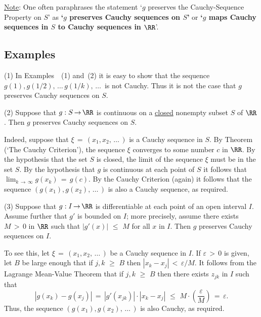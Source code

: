         \underline{Note}: One often paraphrases the statement `$g$ preserves the Cauchy-Sequence Property on $S$' as {\bf `$g$ preserves Cauchy sequences on $S$'}  or {\bf `$g$ maps Cauchy sequences in $S$ to Cauchy sequences in ${\RR}$}'.

\V

            \subsection{\small{\bf Examples}}
            \label{ExampF20.70}

\V

\hspace*{\parindent}(1) In Examples~~(1) and~(2) it is easy to show that the sequence $g(1), g(1/2), \,{\ldots}\,g(1/k),\,{\ldots}\,$ is not Cauchy.
    Thus it is not the case that $g$ preserves Cauchy sequences on $S$.

\V

        (2) Suppose that $g:S \,{\rightarrow}\, {\RR}$ is continuous on a \underline{closed} nonempty subset $S$  of ${\RR}$.
    Then $g$ preserves Cauchy sequences on $S$.

        Indeed, suppose that ${\xi} \,=\, (x_{1},x_{2},\,{\ldots}\,)$ is a Cauchy sequence in $S$.
    By Theorem~ (`The Cauchy Criterion'), the sequence ${\xi}$ converges to some number $c$ in ${\RR}$.
    By the hypothesis that the set $S$ is closed, the limit of the sequence ${\xi}$ must be in the set $S$.
    By the hypothesis that $g$ is continuous at each point of $S$ it follows that $\lim_{k \,{\rightarrow}\, {\infty}} g(x_{k}) \,=\, g(c)$.
    By the Cauchy Criterion (again) it follows that the sequence $(g(x_{1}),g(x_{2}),\,{\ldots}\,)$ is also a Cauchy sequence, as required.

\V

        (3) Suppose that $g:I \,{\rightarrow}\, {\RR}$ is differentiable at each point of an open interval $I$.
    Assume further that $g'$ is bounded on $I$; more precisely, assume there exists $M\,>\,0$ in ${\RR}$ such that $|g'(x)|\,\,{\leq}\,\,M$ for all $x$ in $I$.
    Then $g$ preserves Cauchy sequences on $I$.

        To see this, let ${\xi} \,=\, (x_{1},x_{2},\,{\ldots}\,)$ be a Cauchy sequence in $I$.
    If ${\varepsilon}\,>\,0$ is given, let $B$ be large enough that if $j,k\,\,{\geq}\,\,B$ then $|x_{k}-x_{j}|\,<\,{\varepsilon}/M$.
    It follows from the Lagrange Mean-Value Theorem that if $j,k\,\,{\geq}\,\,B$ then there exists $z_{jk}$ in $I$ such that
        \begin{displaymath}
        |g(x_{k})-g(x_{j})| \,=\, |g'(x_{jk})|{\cdot}|x_{k}-x_{j}|\,\,{\leq}\,\,
    M{\cdot}\left(\frac{{\varepsilon}}{M}\right) \,=\, {\varepsilon}.
        \end{displaymath}
    Thus, the sequence $(g(x_{1}),g(x_{2}),\,{\ldots}\,)$ is also Cauchy, as required.

